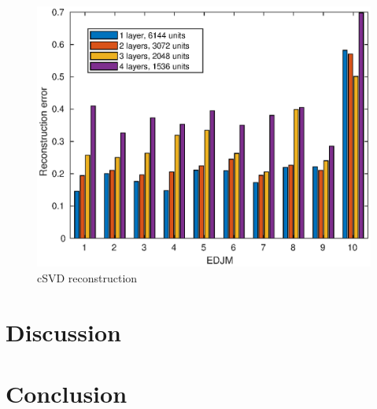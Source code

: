 \begin{figure}[H]
  \centering
  \includegraphics[scale=0.6]{Figures/csvd_reconstruction.eps}
  \caption{cSVD reconstruction}
  \label{fig:csvd:reconstruction}
\end{figure}

\section{Discussion}

\section{Conclusion}
